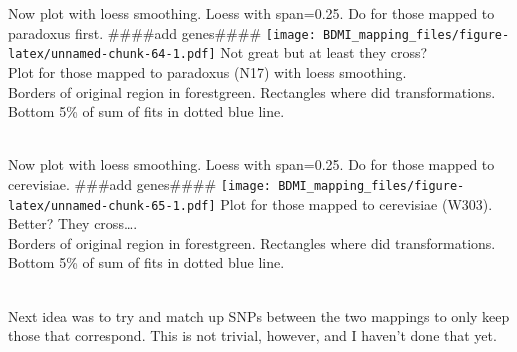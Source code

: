 \documentclass[
]{article}
\begin{document}
Now plot with loess smoothing. Loess with span=0.25. Do for those mapped
to paradoxus first. \#\#\#\#add genes\#\#\#\#
\texttt{[image: BDMI\_mapping\_files/figure-latex/unnamed-chunk-64-1.pdf]}
Not great but at least they cross?\\
Plot for those mapped to paradoxus (N17) with loess smoothing.\\
Borders of original region in forestgreen. Rectangles where did
transformations.\\
Bottom 5\% of sum of fits in dotted blue line.\\
\strut \\
Now plot with loess smoothing. Loess with span=0.25. Do for those mapped
to cerevisiae. \#\#\#add genes\#\#\#\#
\texttt{[image: BDMI\_mapping\_files/figure-latex/unnamed-chunk-65-1.pdf]}
Plot for those mapped to cerevisiae (W303).\\
Better? They cross\ldots.\\
Borders of original region in forestgreen. Rectangles where did
transformations.\\
Bottom 5\% of sum of fits in dotted blue line.\\
\strut \\
Next idea was to try and match up SNPs between the two mappings to only
keep those that correspond. This is not trivial, however, and I haven't
done that yet.\\
\end{document}
